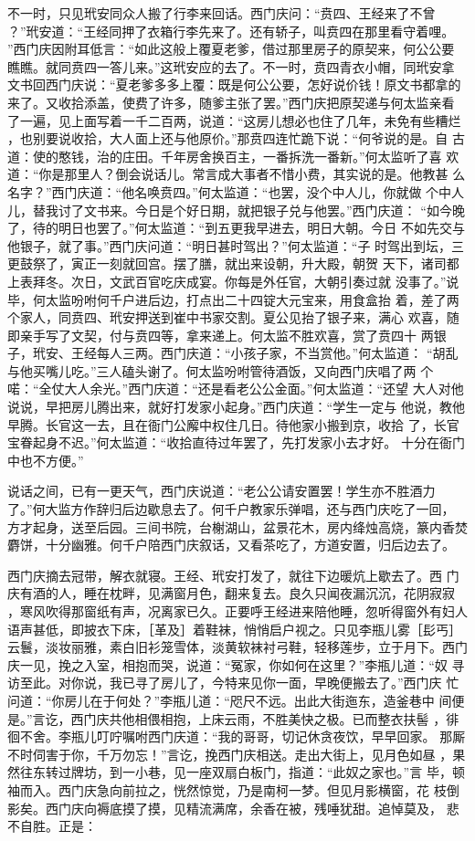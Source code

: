 不一时，只见玳安同众人搬了行李来回话。西门庆问：“贲四、王经来了不曾
？”玳安道：“王经同押了衣箱行李先来了。还有轿子，叫贲四在那里看守着哩。
”西门庆因附耳低言：“如此这般上覆夏老爹，借过那里房子的原契来，何公公要
瞧瞧。就同贲四一答儿来。”这玳安应的去了。不一时，贲四青衣小帽，同玳安拿
文书回西门庆说：“夏老爹多多上覆：既是何公公要，怎好说价钱！原文书都拿的
来了。又收拾添盖，使费了许多，随爹主张了罢。”西门庆把原契递与何太监亲看
了一遍，见上面写着一千二百两，说道：“这房儿想必也住了几年，未免有些糟烂
，也别要说收拾，大人面上还与他原价。”那贲四连忙跪下说：“何爷说的是。自
古道：使的憨钱，治的庄田。千年房舍换百主，一番拆洗一番新。”何太监听了喜
欢道：“你是那里人？倒会说话儿。常言成大事者不惜小费，其实说的是。他教甚
么名字？”西门庆道：“他名唤贲四。”何太监道：“也罢，没个中人儿，你就做
个中人儿，替我讨了文书来。今日是个好日期，就把银子兑与他罢。”西门庆道：
“如今晚了，待的明日也罢了。”何太监道：“到五更我早进去，明日大朝。今日
不如先交与他银子，就了事。”西门庆问道：“明日甚时驾出？”何太监道：“子
时驾出到坛，三更鼓祭了，寅正一刻就回宫。摆了膳，就出来设朝，升大殿，朝贺
天下，诸司都上表拜冬。次日，文武百官吃庆成宴。你每是外任官，大朝引奏过就
没事了。”说毕，何太监吩咐何千户进后边，打点出二十四锭大元宝来，用食盒抬
着，差了两个家人，同贲四、玳安押送到崔中书家交割。夏公见抬了银子来，满心
欢喜，随即亲手写了文契，付与贲四等，拿来递上。何太监不胜欢喜，赏了贲四十
两银子，玳安、王经每人三两。西门庆道：“小孩子家，不当赏他。”何太监道：
“胡乱与他买嘴儿吃。”三人磕头谢了。何太监吩咐管待酒饭，又向西门庆唱了两
个喏：“全仗大人余光。”西门庆道：“还是看老公公金面。”何太监道：“还望
大人对他说说，早把房儿腾出来，就好打发家小起身。”西门庆道：“学生一定与
他说，教他早腾。长官这一去，且在衙门公廨中权住几日。待他家小搬到京，收拾
了，长官宝眷起身不迟。”何太监道：“收拾直待过年罢了，先打发家小去才好。
十分在衙门中也不方便。”

说话之间，已有一更天气，西门庆说道：“老公公请安置罢！学生亦不胜酒力
了。”何大监方作辞归后边歇息去了。何千户教家乐弹唱，还与西门庆吃了一回，
方才起身，送至后园。三间书院，台榭湖山，盆景花木，房内绛烛高烧，篆内香焚
麝饼，十分幽雅。何千户陪西门庆叙话，又看茶吃了，方道安置，归后边去了。

西门庆摘去冠带，解衣就寝。王经、玳安打发了，就往下边暖炕上歇去了。西
门庆有酒的人，睡在枕畔，见满窗月色，翻来复去。良久只闻夜漏沉沉，花阴寂寂
，寒风吹得那窗纸有声，况离家已久。正要呼王经进来陪他睡，忽听得窗外有妇人
语声甚低，即披衣下床，［革及］着鞋袜，悄悄启户视之。只见李瓶儿雾［髟丐］
云鬟，淡妆丽雅，素白旧衫笼雪体，淡黄软袜衬弓鞋，轻移莲步，立于月下。西门
庆一见，挽之入室，相抱而哭，说道：“冤家，你如何在这里？”李瓶儿道：“奴
寻访至此。对你说，我已寻了房儿了，今特来见你一面，早晚便搬去了。”西门庆
忙问道：“你房儿在于何处？”李瓶儿道：“咫尺不远。出此大街迤东，造釜巷中
间便是。”言讫，西门庆共他相偎相抱，上床云雨，不胜美快之极。已而整衣扶髻
，徘徊不舍。李瓶儿叮咛嘱咐西门庆道：“我的哥哥，切记休贪夜饮，早早回家。
那厮不时伺害于你，千万勿忘！”言讫，挽西门庆相送。走出大街上，见月色如昼
，果然往东转过牌坊，到一小巷，见一座双扇白板门，指道：“此奴之家也。”言
毕，顿袖而入。西门庆急向前拉之，恍然惊觉，乃是南柯一梦。但见月影横窗，花
枝倒影矣。西门庆向褥底摸了摸，见精流满席，余香在被，残唾犹甜。追悼莫及，
悲不自胜。正是：

